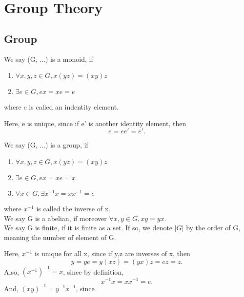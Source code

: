 \chapter{Group Theory}

\section{Group}
\begin{definition}[monoid]  \label{def: monoid}
    We say (G, $\dots$) is a monoid, if
    \begin{enumerate}
        \item $\forall x,y,z \in G, x(yz)=(xy)z$
        \item $\exists e \in G, ex=xe=e$
    \end{enumerate}
    where e is called an indentity element.
\end{definition}

Here, e is unique, since if e' is another identity element, then
\[
    e = ee{'} = e{'}
.\] 


\begin{definition}[group]  \label{def: group}
    We say (G, $\dots$) is a group, if
    \begin{enumerate}
        \item $\forall x,y,z \in G, x(yz)=(xy)z$
        \item $\exists e \in G, ex=xe=x$
        \item $\forall x \in G, \exists x^{-1}x=xx^{-1}=e$
    \end{enumerate}
    where $x^{-1}$ is called the inverse of x.\\
    We say G is a abelian, if moreover $\forall x,y \in G, xy=yx$.\\
    We say G is finite, if it is finite as a set. If so, we denote $\left|G\right|$ by the order of G, meaning the number of element of G.
\end{definition}

Here, $x^{-1}$ is unique for all x, since if y,z are inverses of x, then
\[
y=ye=y(xz)=(yx)z=ez=z
.\] 
Also, $(x^{-1})^{-1}=x$, since by definition,
\[
x^{-1}x=xx^{-1}=e
.\] 
And, $(xy)^{-1} = y^{-1}x^{-1}$, since





